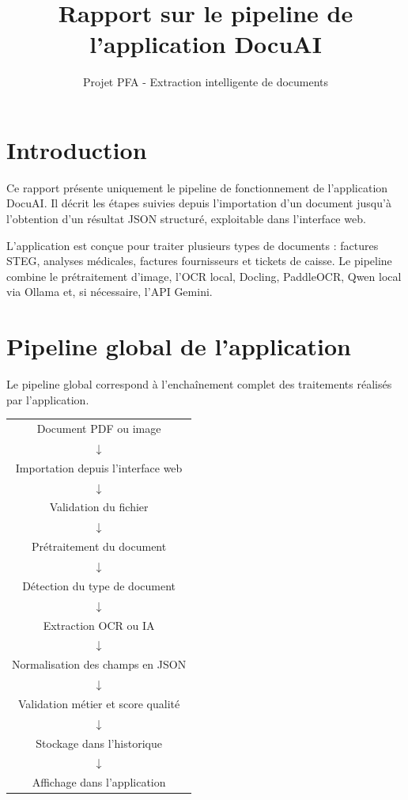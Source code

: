 \documentclass[12pt,a4paper]{report}
\title{Rapport sur le pipeline de l'application DocuAI}
\author{Projet PFA - Extraction intelligente de documents}
\date{}
\begin{document}
\maketitle

\section*{Introduction}

Ce rapport présente uniquement le pipeline de fonctionnement de l'application DocuAI. Il décrit les étapes suivies depuis l'importation d'un document jusqu'à l'obtention d'un résultat JSON structuré, exploitable dans l'interface web.

L'application est conçue pour traiter plusieurs types de documents : factures STEG, analyses médicales, factures fournisseurs et tickets de caisse. Le pipeline combine le prétraitement d'image, l'OCR local, Docling, PaddleOCR, Qwen local via Ollama et, si nécessaire, l'API Gemini.

\section*{Pipeline global de l'application}

Le pipeline global correspond à l'enchaînement complet des traitements réalisés par l'application.

\begin{center}
\begin{tabular}{c}
Document PDF ou image \\
$\downarrow$ \\
Importation depuis l'interface web \\
$\downarrow$ \\
Validation du fichier \\
$\downarrow$ \\
Prétraitement du document \\
$\downarrow$ \\
Détection du type de document \\
$\downarrow$ \\
Extraction OCR ou IA \\
$\downarrow$ \\
Normalisation des champs en JSON \\
$\downarrow$ \\
Validation métier et score qualité \\
$\downarrow$ \\
Stockage dans l'historique \\
$\downarrow$ \\
Affichage dans l'application \\
\end{tabular}
\end{center}
\end{document}
